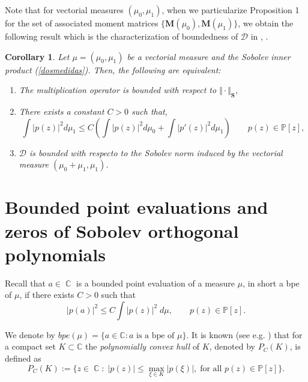 \documentclass[12pt]{amsart}
\theoremstyle{definition}
\theoremstyle{plain}
\newtheorem{corollary}{Corollary}
\theoremstyle{remark}
\DeclareMathOperator{\CC}{\mathbb C}
\begin{document}
\noindent  Note that for vectorial measures $(\mu_0,\mu_1)$, when we particularize Proposition 1 for the set of associated moment matrices $\{\mathbf{M}(\mu_0), \mathbf{M}(\mu_1)\}$, we obtain the following result which is the characterization of boundedness of $\mathcal{D}$ in \cite{JR1}, \cite{JR3}. 

\begin{corollary} Let $\mu=(\mu_0,\mu_1)$  be a vectorial measure and  the Sobolev inner product (\ref{dosmedidas}). Then, the following are equivalent: 

\begin{enumerate} 
\item The multiplication operator  is bounded with respect to $\Vert \cdot \Vert_{\mathbf{S}}$, 
\item There  exists a constant $C>0$ such that,
$$
\int \vert p(z) \vert^{2} d\mu_1\leq C (\int \vert p(z) \vert^{2}d\mu_0 + \int \vert p'(z) \vert^{2} d\mu_1) \qquad p(z) \in \mathbb{P}[z],
$$
\item $\mathcal{D}$
is bounded with respecto to the Sobolev norm induced by the vectorial measure $(\mu_0+\mu_1,\mu_1)$.
\end{enumerate}
\end{corollary}

\section{Bounded point evaluations and zeros of Sobolev orthogonal polynomials} 





\noindent Recall that $a\in \CC$ is a bounded point evaluation of a measure $\mu$, in short a bpe of $\mu$,  if there exists $C>0$ such that $$ \vert p (a) \vert^2 \leq C \int \vert p(z) \vert^2 \; d\mu, \qquad p(z)\in \mathbb{P}[z].
$$


\noindent We denote by $bpe(\mu)= \{a\in \mathbb{C}: a \text{ is a bpe of  }  \mu\}$. It is known  (see e.g.   \cite{Conway}) that 
for a compact set  $K\subset \mathbb{C}$  the {\it polynomially convex 
hull } of $K$, denoted by $P_C{(K)}$, is defined as
$$
P_C(K):=\{ z\in \CC:  \; \vert p(z) \vert \leq \max_{\xi \in K}\vert p(\xi) \vert,  \; \text{for all } p(z)\in \mathbb{P}[z] \}.
$$
\end{document}
